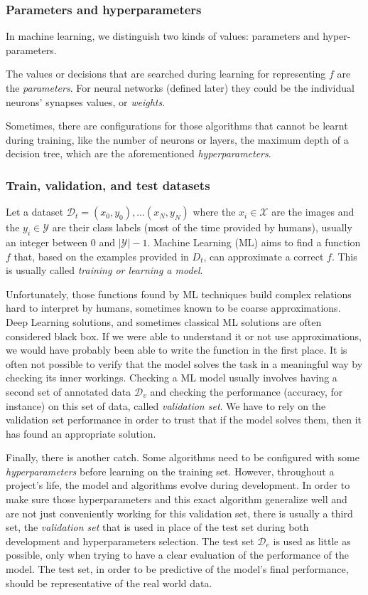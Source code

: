 \subsubsection{Parameters and hyperparameters}

In machine learning, we distinguish two kinds of values: parameters and hyper-parameters.

The values or decisions that are searched during learning for representing $f$ are the \emph{parameters}. For neural networks (defined later) they could be the individual neurons' synapses values, or \emph{weights}.

Sometimes, there are configurations for those algorithms that cannot be learnt during training, like the number of neurons or layers, the maximum depth of a decision tree, which are the aforementioned \emph{hyperparameters}.

\subsubsection{Train, validation, and test datasets}

Let a dataset $\mathcal{D}_t={(x_0, y_0), ...(x_N, y_N)}$ where the $x_i \in \mathcal{X}$ are the images and the $y_i \in \mathcal{Y}$ are their class labels (most of the time provided by humans), usually an integer between 0 and $|\mathcal{Y}|-1$. Machine Learning (ML) aims to find a function $f$ that, based on the examples provided in $D_t$, can approximate a correct $f$. This is usually called \emph{training or learning a model}.

Unfortunately, those functions found by ML techniques build complex relations hard to interpret by humans, sometimes known to be coarse approximations. Deep Learning solutions, and sometimes classical ML solutions are often considered black box. If we were able to understand it or not use approximations, we would have probably been able to write the function in the first place. It is often not possible to verify that the model solves the task in a meaningful way by checking its inner workings. Checking a ML model usually involves having a second set of annotated data $\mathcal{D}_v$ and checking the performance (accuracy, for instance) on this set of data, called \emph{validation set}. We have to rely on the validation set performance in order to trust that if the model solves them, then it has found an appropriate solution.

Finally, there is another catch. Some algorithms need to be configured with some \emph{hyperparameters} before learning on the training set. However, throughout a project's life, the model and algorithms evolve during development. In order to make sure those hyperparameters and this exact algorithm generalize well and are not just conveniently working for this validation set, there is usually a third set, the \emph{validation set} that is used in place of the test set during both development and hyperparameters selection. The test set $\mathcal{D}_e$ is used as little as possible, only when trying to have a clear evaluation of the performance of the model. The test set, in order to be predictive of the model's final performance, should be representative of the real world data.

